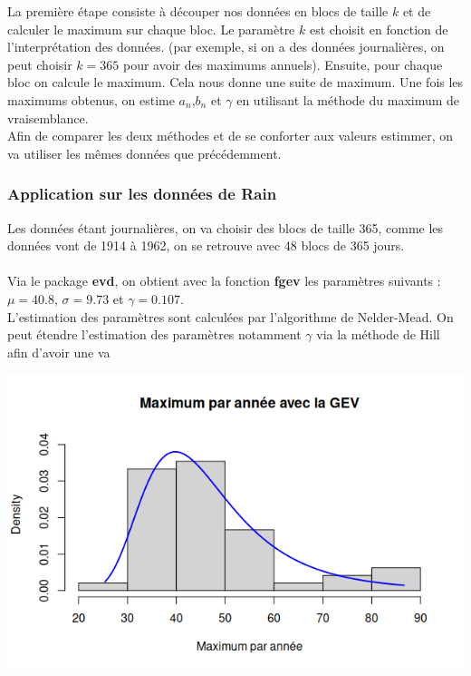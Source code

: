 \documentclass{article}
\begin{document}
La première étape consiste à découper nos données en blocs de taille $k$ et de calculer le maximum sur chaque bloc. Le paramètre
$k$ est choisit en fonction de l'interprétation des données. (par exemple, si on a des données journalières, on peut choisir $k=365$ pour avoir des maximums annuels).
Ensuite, pour chaque bloc on calcule le maximum. Cela nous donne une suite de maximum.
Une fois les maximums obtenus, on estime $a_n$,$b_n$ et $\gamma$ en utilisant la méthode du maximum de vraisemblance.
\\
Afin de comparer les deux méthodes et de se conforter aux valeurs estimmer, on va utiliser les mêmes données que précédemment.


\subsubsection{Application sur les données de Rain}

Les données étant journalières, on va choisir des blocs de taille 365, comme les données vont de 1914 à 1962, on se retrouve avec 48 blocs de 365 jours.
\\
\\
Via le package \textbf{evd}, on obtient avec la fonction \textbf{fgev} les paramètres suivants :
\\
$\mu = 40.8$, $\sigma = 9.73$ et $\gamma = 0.107$.
\\
L'estimation des paramètres sont calculées par l'algorithme de Nelder-Mead. On peut étendre l'estimation des paramètres notamment $\gamma$ via la méthode de Hill afin d'avoir une va
\begin{center}
	\includegraphics[scale=0.8]{./images/gevrainmaxbloc.png} 
\end{center}
\end{document}
